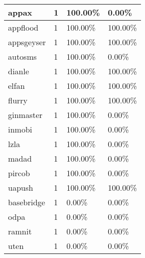 \begin{table}[]
\begin{tabular}{|l|l|l|l|}
appax                   & 1                & 100.00\%              & 0.00\%                     \\ \hline
appflood                & 1                & 100.00\%              & 100.00\%                   \\ \hline
appsgeyser              & 1                & 100.00\%              & 100.00\%                   \\ \hline
autosms                 & 1                & 100.00\%              & 0.00\%                     \\ \hline
dianle                  & 1                & 100.00\%              & 100.00\%                   \\ \hline
elfan                   & 1                & 100.00\%              & 100.00\%                   \\ \hline
flurry                  & 1                & 100.00\%              & 100.00\%                   \\ \hline
ginmaster               & 1                & 100.00\%              & 0.00\%                     \\ \hline
inmobi                  & 1                & 100.00\%              & 0.00\%                     \\ \hline
lzla                    & 1                & 100.00\%              & 0.00\%                     \\ \hline
madad                   & 1                & 100.00\%              & 0.00\%                     \\ \hline
pircob                  & 1                & 100.00\%              & 0.00\%                     \\ \hline
uapush                  & 1                & 100.00\%              & 100.00\%                   \\ \hline
basebridge              & 1                & 0.00\%                & 0.00\%                     \\ \hline
odpa                    & 1                & 0.00\%                & 0.00\%                     \\ \hline
ramnit                  & 1                & 0.00\%                & 0.00\%                     \\ \hline
uten                    & 1                & 0.00\%                & 0.00\%                     \\ \hline
\end{tabular}
\end{table}